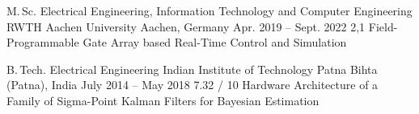 \begin{cveducation}

\cvschool
	{M.\,Sc.} %
	{Electrical Engineering, Information Technology and Computer Engineering} %
	{RWTH Aachen University} %
	{Aachen, Germany  {\acvHeaderIconSep{}} {} } %
	{Apr. 2019 -- Sept. 2022} %
	{2,1} %
	{Field-Programmable Gate Array based Real-Time Control and Simulation} %
	{}

\cvschool
	{B.\,Tech.} %
	{Electrical Engineering} %
	{Indian Institute of Technology Patna} %
	{Bihta (Patna), India  {\acvHeaderIconSep{}} {} } %
	{July 2014 -- May 2018} %
	{7.32 / 10} %
	{Hardware Architecture of a Family of Sigma-Point Kalman Filters for Bayesian Estimation} %
	{}



\end{cveducation}
